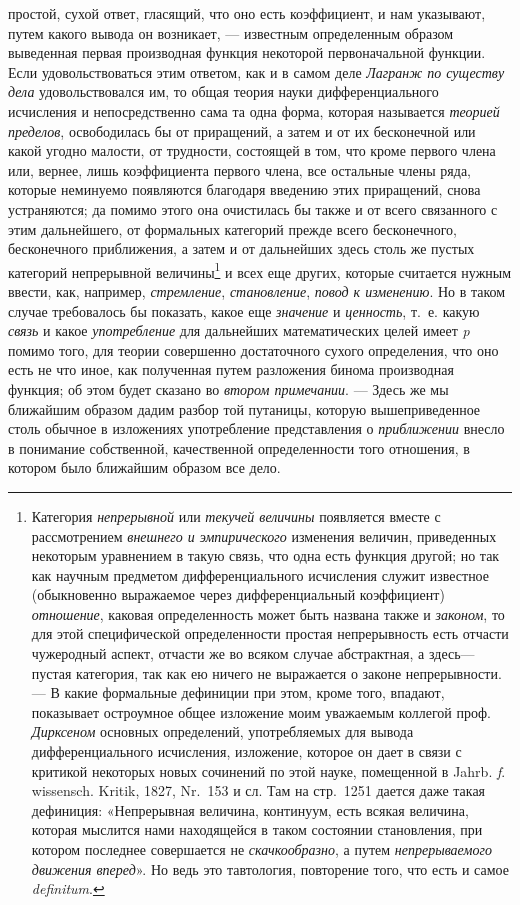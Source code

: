 простой, сухой ответ, гласящий, что оно есть коэффициент, и нам указывают,
путем какого вывода он возникает, — известным определенным образом
выведенная первая производная функция некоторой первоначальной функции.
Если удовольствоваться этим ответом, как и в самом деле
{\em Лагранж по существу дела} удовольствовался им, то
общая теория науки дифференциального исчисления и непосредственно сама та
одна форма, которая называется {\em теорией пределов},
освободилась бы от приращений, а затем и от их бесконечной или какой угодно
малости, от трудности, состоящей в том, что кроме первого члена или,
вернее, лишь коэффициента первого члена, все остальные члены ряда, которые
неминуемо появляются благодаря введению этих приращений, снова устраняются;
да помимо этого она очистилась бы также и от всего связанного с этим
дальнейшего, от формальных категорий прежде всего бесконечного,
бесконечного приближения, а затем и от дальнейших здесь столь же пустых
категорий непрерывной величины\footnote{Категория
{\em непрерывной} или {\em текучей величины} появляется вместе с рассмотрением
{\em внешнего и эмпирического} изменения величин,
приведенных некоторым уравнением в такую
связь, что одна есть функция другой; но так как научным предметом
дифференциального исчисления служит известное (обыкновенно выражаемое через
дифференциальный коэффициент) {\em отношение}, каковая
определенность может быть названа также и {\em законом}, то для
этой специфической определенности простая непрерывность есть отчасти
чужеродный аспект, отчасти же во всяком случае абстрактная, а здесь— пустая
категория, так как ею ничего не выражается о законе непрерывности. —
В какие формальные дефиниции при этом, кроме того, впадают,
показывает остроумное общее изложение моим уважаемым коллегой проф.
{\em Дирксеном} основных
определений, употребляемых для вывода дифференциального исчисления,
изложение, которое он дает в связи с критикой некоторых новых сочинений по
этой науке, помещенной в Jahrb. {\em f}.
wissensch. Kritik, 1827, Nr.~153 и сл. Там на стр.~1251
дается даже такая дефиниция: «Непрерывная величина, континуум, есть всякая
величина, которая мыслится нами находящейся в таком состоянии становления,
при котором последнее совершается не
{\em скачкообразно}, а путем {\em непрерываемого движения
вперед}». Но ведь это тавтология, повторение того, что есть
и самое {\em definitum}.} и всех еще других, которые
считается нужным ввести, как, например,
{\em стремление},
{\em становление}, {\em повод к
изменению}. Но в таком случае требовалось бы показать, какое еще
{\em значение} и
{\em ценность}, т.~е. какую
{\em связь} и какое
{\em употребление} для дальнейших математических целей
имеет {\em p} помимо того, для теории совершенно
достаточного сухого определения, что оно есть не что иное, как полученная
путем разложения бинома производная функция; об этом будет сказано во
{\em втором примечании}. — Здесь же мы ближайшим
образом дадим разбор той путаницы, которую вышеприведенное столь обычное в
изложениях употребление представления о
{\em приближении} внесло в понимание собственной,
качественной определенности того отношения, в котором было ближайшим
образом все дело.


